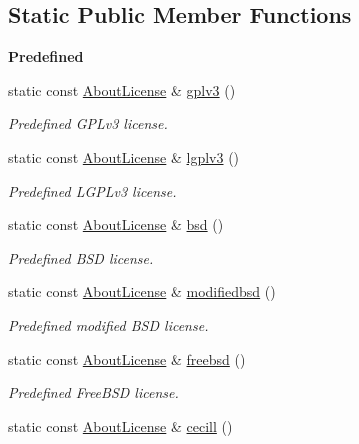 \subsection*{Static Public Member Functions}
\begin{Indent}{\bf Predefined}\par
\begin{DoxyCompactItemize}
\item 
static const \hyperlink{exceptionmagrathea_1_1AboutLicense}{About\-License} \& \hyperlink{exceptionmagrathea_1_1AboutLicense_a09e70a2210983b24a10d8c61f7450190}{gplv3} ()
\begin{DoxyCompactList}\small\item\em Predefined G\-P\-Lv3 license. \end{DoxyCompactList}\item 
static const \hyperlink{exceptionmagrathea_1_1AboutLicense}{About\-License} \& \hyperlink{exceptionmagrathea_1_1AboutLicense_adefa66d22f7eccf37552fe7c6b78ff96}{lgplv3} ()
\begin{DoxyCompactList}\small\item\em Predefined L\-G\-P\-Lv3 license. \end{DoxyCompactList}\item 
static const \hyperlink{exceptionmagrathea_1_1AboutLicense}{About\-License} \& \hyperlink{exceptionmagrathea_1_1AboutLicense_a699c03349945b3a903d19594a0246f61}{bsd} ()
\begin{DoxyCompactList}\small\item\em Predefined B\-S\-D license. \end{DoxyCompactList}\item 
static const \hyperlink{exceptionmagrathea_1_1AboutLicense}{About\-License} \& \hyperlink{exceptionmagrathea_1_1AboutLicense_aa38fae5ae527568807106f0b148653d1}{modifiedbsd} ()
\begin{DoxyCompactList}\small\item\em Predefined modified B\-S\-D license. \end{DoxyCompactList}\item 
static const \hyperlink{exceptionmagrathea_1_1AboutLicense}{About\-License} \& \hyperlink{exceptionmagrathea_1_1AboutLicense_a95210c7f5ba8e9bd692414fea58da592}{freebsd} ()
\begin{DoxyCompactList}\small\item\em Predefined Free\-B\-S\-D license. \end{DoxyCompactList}\item 
static const \hyperlink{exceptionmagrathea_1_1AboutLicense}{About\-License} \& \hyperlink{exceptionmagrathea_1_1AboutLicense_a7ff9765d47e3b69bf18167e7b912ad74}{cecill} ()

\end{DoxyCompactItemize}
\end{Indent}
